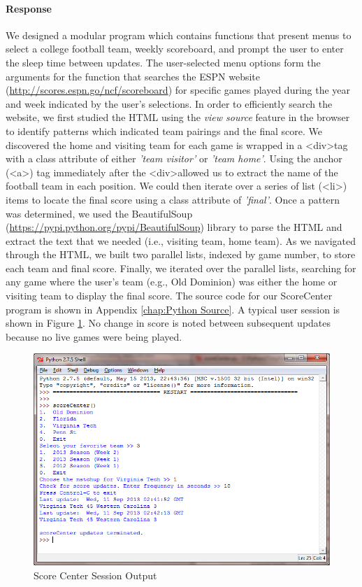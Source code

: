 \documentclass[letterpaper,11pt]{report}
\begin{document}
\begin{savenotes}
\paragraph{Response}We designed a modular program which contains functions that present menus to select a college football team, weekly scoreboard, and prompt the user to enter the sleep time between updates. The user-selected menu options form the arguments for the function that searches the ESPN website (\url{http://scores.espn.go/ncf/scoreboard}) for specific games played during the year and week indicated by the user's selections. In order to efficiently search the website, we first studied the HTML using the \emph{view source} feature in the browser to identify patterns which indicated team pairings and the final score. We discovered the home and visiting team for each game is wrapped in a \textless div\textgreater tag with a class attribute of either \emph{'team visitor'} or \emph{'team home'}. Using the anchor (\textless a\textgreater) tag immediately after the \textless div\textgreater allowed us to extract the name of the football team in each position. We could then iterate over a series of list (\textless li\textgreater) items to locate the final score using a class attribute of \emph{'final'}. Once a pattern was determined, we used the BeautifulSoup (\url{https://pypi.python.org/pypi/BeautifulSoup}) library to parse the HTML and extract the text that we needed (i.e., visiting team, home team). As we navigated through the HTML, we built two parallel lists, indexed by game number, to store each team and final score. Finally, we iterated over the parallel lists, searching for any game where the user's team (e.g., Old Dominion) was either the home or visiting team to display the final score. The source code for our ScoreCenter program is shown in Appendix \ref{chap:Python Source}. A typical user session is shown in Figure \ref{fig:scoreCenterOutput}. No change in score is noted between subsequent updates because no live games were being played.


\begin{figure}[htbp]
	\centering
		\includegraphics[width=.90\textwidth]{scoreCenterOutput.png}
	\caption{Score Center Session Output}
	\label{fig:scoreCenterOutput}
\end{figure}


\end{savenotes}
\end{document}
